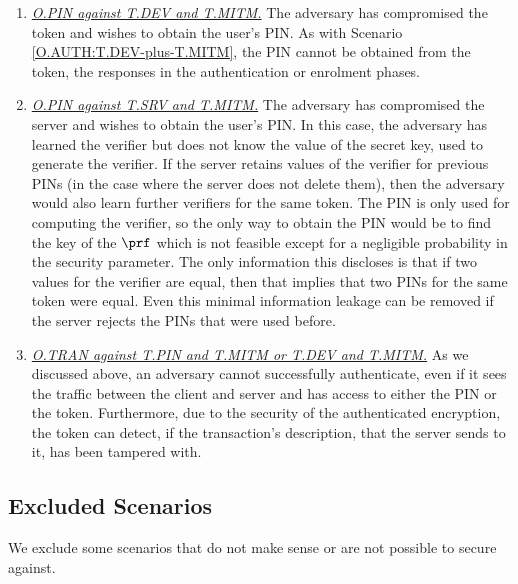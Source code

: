 \begin{enumerate}[leftmargin=5mm]
\item\underline{\textit{O.PIN against T.DEV and  T.MITM.}}
The adversary has compromised the token and wishes to obtain the user's PIN. As with Scenario \ref{O.AUTH:T.DEV-plus-T.MITM}, the PIN cannot be obtained from the token, the responses in the authentication or enrolment phases.

\item\underline{\textit{O.PIN against T.SRV and T.MITM.}}
\label{sec:servercompromise}
The adversary has compromised the server and wishes to obtain the user's PIN.
In this case, the adversary has learned the verifier but does not know the value of the secret key, used to generate the verifier. If the server retains values of the verifier for previous PINs (in the case where the server does not delete them), then the adversary would also learn further verifiers for the same token. The PIN is only used for computing the verifier, so the only way to obtain the PIN would be to find the key of the $\prf$ which is not feasible except for a negligible probability in the security parameter. The only information this discloses is that if two values for the verifier are equal, then that implies that two PINs for the same token were equal. Even this minimal information leakage can be removed if the server rejects the PINs that were used before. 

\item\underline{\textit{O.TRAN against T.PIN and T.MITM or T.DEV and T.MITM.}} As we discussed above, an adversary cannot successfully authenticate, even if it sees the traffic between the client and server and has access to either the PIN or the token. Furthermore, due to the security of the authenticated encryption, the token can detect, if the transaction's description, that the server sends to it, has been tampered with. 
 
\end{enumerate}

\vspace{-2mm}
\subsection{Excluded Scenarios}
\vspace{-1mm}

We exclude some scenarios that do not make sense or are not possible to secure against.


